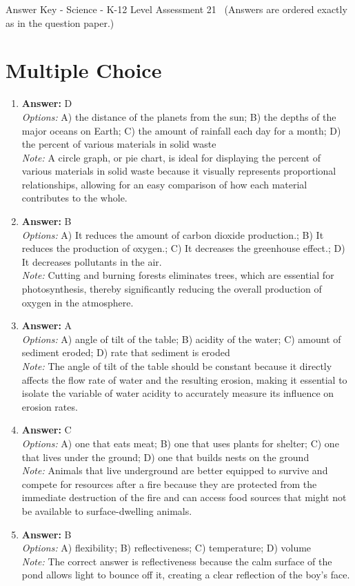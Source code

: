 \documentclass[12pt]{article}
\begin{document}
\begin{center}
Answer Key - Science - K-12 Level Assessment 21 \
\small (Answers are ordered exactly as in the question paper.)
\end{center}

\section*{Multiple Choice}
\begin{enumerate}[label=\arabic*.]
\item \textbf{Answer:} D
\\ \textit{Options:} A) the distance of the planets from the sun; B) the depths of the major oceans on Earth; C) the amount of rainfall each day for a month; D) the percent of various materials in solid waste
\\ \textit{Note:} A circle graph, or pie chart, is ideal for displaying the percent of various materials in solid waste because it visually represents proportional relationships, allowing for an easy comparison of how each material contributes to the whole.
\item \textbf{Answer:} B
\\ \textit{Options:} A) It reduces the amount of carbon dioxide production.; B) It reduces the production of oxygen.; C) It decreases the greenhouse effect.; D) It decreases pollutants in the air.
\\ \textit{Note:} Cutting and burning forests eliminates trees, which are essential for photosynthesis, thereby significantly reducing the overall production of oxygen in the atmosphere.
\item \textbf{Answer:} A
\\ \textit{Options:} A) angle of tilt of the table; B) acidity of the water; C) amount of sediment eroded; D) rate that sediment is eroded
\\ \textit{Note:} The angle of tilt of the table should be constant because it directly affects the flow rate of water and the resulting erosion, making it essential to isolate the variable of water acidity to accurately measure its influence on erosion rates.
\item \textbf{Answer:} C
\\ \textit{Options:} A) one that eats meat; B) one that uses plants for shelter; C) one that lives under the ground; D) one that builds nests on the ground
\\ \textit{Note:} Animals that live underground are better equipped to survive and compete for resources after a fire because they are protected from the immediate destruction of the fire and can access food sources that might not be available to surface-dwelling animals.
\item \textbf{Answer:} B
\\ \textit{Options:} A) flexibility; B) reflectiveness; C) temperature; D) volume
\\ \textit{Note:} The correct answer is reflectiveness because the calm surface of the pond allows light to bounce off it, creating a clear reflection of the boy's face.
\end{enumerate}
\end{document}
